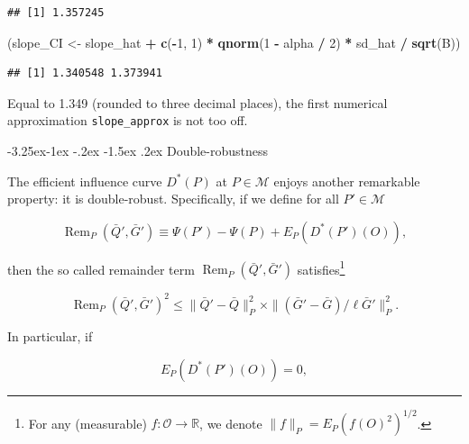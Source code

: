\documentclass[]{article}
\makeatletter
\newenvironment{Shaded}{\begin{snugshade}}{\end{snugshade}}
\newcommand{\DecValTok}[1]{\textcolor[rgb]{0.00,0.00,0.81}{#1}}
\newcommand{\KeywordTok}[1]{\textcolor[rgb]{0.13,0.29,0.53}{\textbf{#1}}}
\newcommand{\NormalTok}[1]{#1}
\newcommand{\OperatorTok}[1]{\textcolor[rgb]{0.81,0.36,0.00}{\textbf{#1}}}
\newcommand{\StringTok}[1]{\textcolor[rgb]{0.31,0.60,0.02}{#1}}
\let\rmarkdownfootnote\footnote%
\def\footnote{\protect\rmarkdownfootnote}
\renewcommand\subsection{\@startsection{subsection}{3}{\z@}%
                                     {-3.25ex\@plus -1ex \@minus -.2ex}%
                                     {-1.5ex \@plus .2ex}%
                                     {\normalfont\normalsize\bfseries}}
\DeclareMathOperator{\Rem}{Rem}
\newcommand{\bbR}{\mathbb{R}}
\newcommand{\calM}{\mathcal{M}}
\newcommand{\calO}{\mathcal{O}}
\newcommand{\Gbar}{\bar{G}}
\newcommand{\Qbar}{\bar{Q}}
\theoremstyle{definition}
\theoremstyle{definition}
\theoremstyle{definition}
\theoremstyle{remark}
\makeatother
\begin{document}
\begin{verbatim}
## [1] 1.357245
\end{verbatim}

\begin{Shaded}
\begin{Highlighting}[]
\NormalTok{(slope_CI <-}\StringTok{ }\NormalTok{slope_hat }\OperatorTok{+}\StringTok{ }\KeywordTok{c}\NormalTok{(}\OperatorTok{-}\DecValTok{1}\NormalTok{, }\DecValTok{1}\NormalTok{) }\OperatorTok{*}\StringTok{ }\KeywordTok{qnorm}\NormalTok{(}\DecValTok{1} \OperatorTok{-}\StringTok{ }\NormalTok{alpha }\OperatorTok{/}\StringTok{ }\DecValTok{2}\NormalTok{) }\OperatorTok{*}\StringTok{ }\NormalTok{sd_hat }\OperatorTok{/}\StringTok{ }\KeywordTok{sqrt}\NormalTok{(B))}
\end{Highlighting}
\end{Shaded}

\begin{verbatim}
## [1] 1.340548 1.373941
\end{verbatim}

Equal to 1.349 (rounded to three decimal places), the first numerical
approximation \texttt{slope\_approx} is not too off.

\subsection{Double-robustness}
\label{subsec:double:robustness}

The efficient influence curve \(D^{*}(P)\) at \(P \in \calM\) enjoys
another remarkable property: it is double-robust. Specifically, if we
define for all \(P' \in \calM\)

\begin{equation}\label{eq:rem:one} \Rem_{P} (\Qbar',  \Gbar')\equiv \Psi(P') -
\Psi(P) + E_{P} (D^{*}(P') (O)), \end{equation}

then the so called remainder term \(\Rem_{P} (\Qbar', \Gbar')\)
satisfies\footnote{For  any   (measurable)  $f:\calO  \to  \bbR$,   we  denote
$\|f\|_{P} = E_{P} (f(O)^{2})^{1/2}$.}

\begin{equation}\label{eq:rem:two}   \Rem_{P}    (\Qbar',   \Gbar')^{2}   \leq
\|\Qbar'  - \Qbar\|_{P}^{2}  \times  \|(\Gbar' -  \Gbar)/\ell\Gbar'\|_{P}^{2}.
\end{equation}

In particular, if

\begin{equation}\label{eq:solves:eic} E_{P} (D^{*}(P') (O)) =
0,\end{equation}
\end{document}

